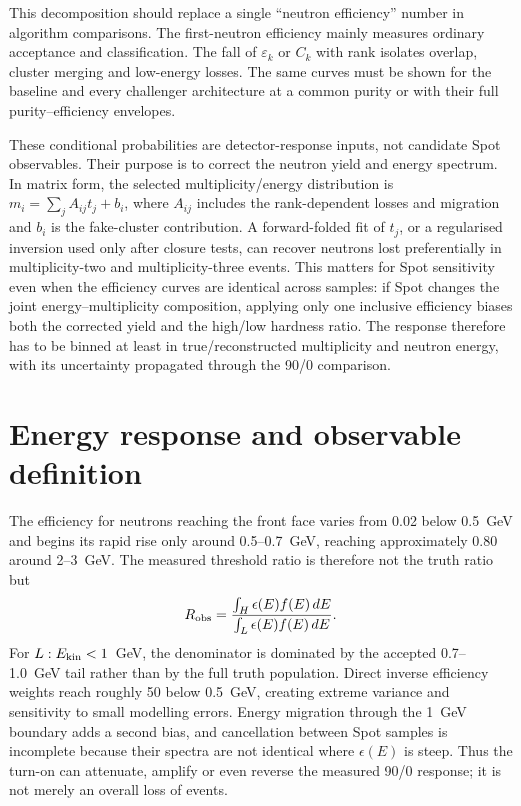 \documentclass[11pt,a4paper]{article}
\newcommand{\Ekin}{E_{\rm kin}}
\begin{document}
This decomposition should replace a single ``neutron efficiency'' number in
algorithm comparisons.  The first-neutron efficiency mainly measures ordinary
acceptance and classification.  The fall of $\varepsilon_k$ or $C_k$ with rank
isolates overlap, cluster merging and low-energy losses.  The same curves must
be shown for the baseline and every challenger architecture at a common purity
or with their full purity--efficiency envelopes.

These conditional probabilities are detector-response inputs, not candidate
Spot observables.  Their purpose is to correct the neutron yield and energy
spectrum.  In matrix form, the selected multiplicity/energy distribution is
$m_i=\sum_j A_{ij}t_j+b_i$, where $A_{ij}$ includes the rank-dependent losses
and migration and $b_i$ is the fake-cluster contribution.  A forward-folded fit
of $t_j$, or a regularised inversion used only after closure tests, can recover
neutrons lost preferentially in multiplicity-two and multiplicity-three
events.  This matters for Spot sensitivity even when the efficiency curves are
identical across samples: if Spot changes the joint energy--multiplicity
composition, applying only one inclusive efficiency biases both the corrected
yield and the high/low hardness ratio.  The response therefore has to be binned
at least in true/reconstructed multiplicity and neutron energy, with its
uncertainty propagated through the 90/0 comparison.

\section{Energy response and observable definition}

The efficiency for neutrons reaching the front face varies from 0.02 below
0.5~GeV and begins its rapid rise only around 0.5--0.7~GeV, reaching
approximately 0.80 around 2--3~GeV.  The measured threshold ratio is therefore
not the truth ratio but
\[
 R_{\rm obs}=\frac{\int_H \epsilon(E)f(E)\,dE}
                   {\int_L \epsilon(E)f(E)\,dE}.
\]
For $L:\Ekin<1$~GeV, the denominator is dominated by the accepted
0.7--1.0~GeV tail rather than by the full truth population.  Direct inverse
efficiency weights reach roughly 50 below 0.5~GeV, creating extreme variance
and sensitivity to small modelling errors.  Energy migration through the
1~GeV boundary adds a second bias, and cancellation between Spot samples is
incomplete because their spectra are not identical where $\epsilon(E)$ is
steep.  Thus the turn-on can attenuate, amplify or even reverse the measured
90/0 response; it is not merely an overall loss of events.
\end{document}
